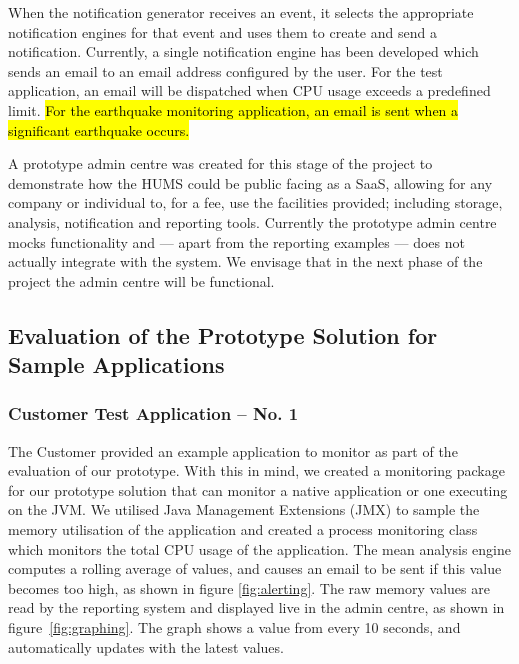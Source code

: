 \documentclass[10pt,a4paper]{article}
\begin{document}

When the notification generator receives an event, it selects the appropriate notification engines for that event and uses them to create and send a notification. Currently, a single notification engine has been developed which sends an email to an email address configured by the user. For the test application, an email will be dispatched when CPU usage exceeds a predefined limit. \hl{For the earthquake monitoring application, an email is sent when a significant earthquake occurs.} %


A prototype admin centre was created for this stage of the project to demonstrate how the HUMS could be public facing as a SaaS, allowing for any company or individual to, for a fee, use the facilities provided; including storage, analysis, notification and reporting tools. Currently the prototype admin centre mocks functionality and --- apart from the reporting examples --- does not actually integrate with the system. We envisage that in the next phase of the project the admin centre will be functional.

\subsection{Evaluation of the Prototype Solution for Sample Applications}
\label{sec:prototype-evaluation}

\subsubsection{Customer Test Application -- No. 1}
The Customer provided an example application to monitor as part of the
evaluation of our prototype. With this in mind, we created a monitoring 
package for our prototype solution that can monitor a native application
or one executing on the JVM. We utilised Java Management 
Extensions (JMX) to sample the memory utilisation of the application and
created a process monitoring class which monitors the total
CPU usage of the application. The mean analysis engine computes a 
rolling average of values, and causes an email to be sent if this value
becomes too high, as shown in figure \ref{fig:alerting}. The raw memory
values are read by the reporting system and displayed live in the admin
centre, as shown in figure~\ref{fig:graphing}. The graph shows a value from
every 10 seconds, and automatically updates with the latest values.
\end{document}
